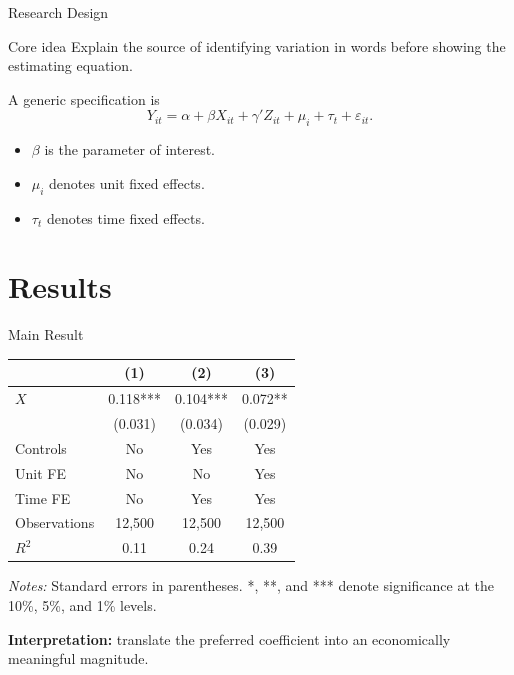 \documentclass[10pt]{beamer}
\begin{document}
\begin{frame}{Research Design}
\begin{block}{Core idea}
Explain the source of identifying variation in words before showing the estimating equation.
\end{block}

\vspace{0.6em}
A generic specification is
\[
  Y_{it} = \alpha + \beta X_{it} + \gamma' Z_{it} + \mu_i + \tau_t + \varepsilon_{it}.
\]

\begin{itemize}
  \item $\beta$ is the parameter of interest.
  \item $\mu_i$ denotes unit fixed effects.
  \item $\tau_t$ denotes time fixed effects.
\end{itemize}
\end{frame}

\section{Results}

\begin{frame}{Main Result}
\centering
\small
\begin{threeparttable}
\begin{tabular}{lccc}
\toprule
 & (1) & (2) & (3) \\
\midrule
$X$ & 0.118*** & 0.104*** & 0.072** \\
    & (0.031)  & (0.034)  & (0.029) \\
\addlinespace
Controls      & No  & Yes & Yes \\
Unit FE       & No  & No  & Yes \\
Time FE       & No  & Yes & Yes \\
Observations  & 12,500 & 12,500 & 12,500 \\
$R^2$         & 0.11 & 0.24 & 0.39 \\
\bottomrule
\end{tabular}
\begin{tablenotes}\scriptsize
\item \textit{Notes:} Standard errors in parentheses. *, **, and *** denote significance at the 10\%, 5\%, and 1\% levels.
\end{tablenotes}
\end{threeparttable}

\vspace{0.7em}
\textbf{Interpretation:} translate the preferred coefficient into an economically meaningful magnitude.
\end{frame}
\end{document}
